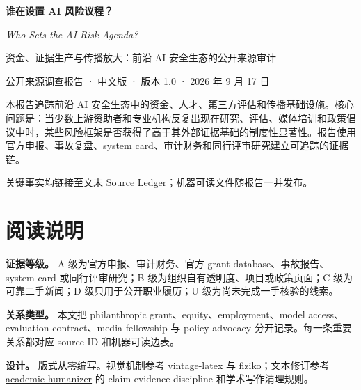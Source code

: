 \documentclass[11pt,twoside]{article}
\begin{document}
\thispagestyle{empty}
\begin{center}
\vspace*{18mm}
{\fontsize{28}{32}\selectfont\bfseries 谁在设置 AI 风险议程？}\par
\vspace{3mm}
{\Large\itshape Who Sets the AI Risk Agenda?}\par
\vspace{7mm}
{\large 资金、证据生产与传播放大：前沿 AI 安全生态的公开来源审计}\par
\vspace{6mm}\printerrule\vspace{4mm}
{\small 公开来源调查报告 · 中文版 · 版本 1.0 · 2026 年 9 月 17 日}\par
\vspace{14mm}
\begin{minipage}{0.80\textwidth}
\small
本报告追踪前沿 AI 安全生态中的资金、人才、第三方评估和传播基础设施。核心问题是：当少数上游资助者和专业机构反复出现在研究、评估、媒体培训和政策倡议中时，某些风险框架是否获得了高于其外部证据基础的制度性显著性。报告使用官方申报、事故复盘、system card、审计财务和同行评审研究建立可追踪的证据链。
\end{minipage}
\vfill
{\footnotesize 关键事实均链接至文末 Source Ledger；机器可读文件随报告一并发布。}\par
\end{center}
\clearpage

\section*{阅读说明}
\noindent\textbf{证据等级。} A 级为官方申报、审计财务、官方 grant database、事故报告、system card 或同行评审研究；B 级为组织自有透明度、项目或政策页面；C 级为可靠二手新闻；D 级只用于公开职业履历；U 级为尚未完成一手核验的线索。

\noindent\textbf{关系类型。} 本文把 philanthropic grant、equity、employment、model access、evaluation contract、media fellowship 与 policy advocacy 分开记录。每一条重要关系都对应 source ID 和机器可读边表。

\noindent\textbf{设计。} 版式从零编写。视觉机制参考 \href{https://github.com/Foadsf/vintage-latex}{vintage-latex} 与 \href{https://github.com/jemmybutton/fiziko}{fiziko}；文本修订参考 \href{https://github.com/AIScientists-Dev/academic-humanizer}{academic-humanizer} 的 claim-evidence discipline 和学术写作清理规则。

\tableofcontents
\clearpage
\end{document}
